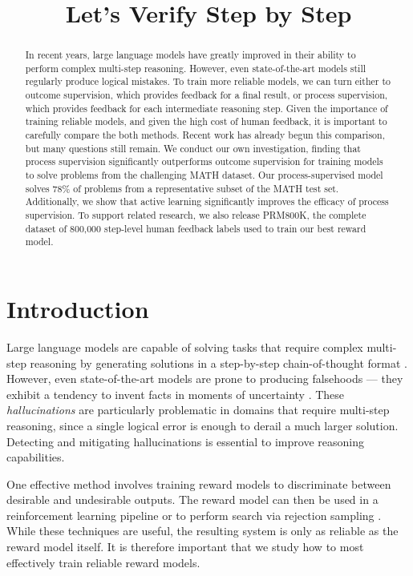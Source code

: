 \title{{ Let's Verify Step by Step}}

\begin{abstract}
In recent years, large language models have greatly improved in their ability to perform complex multi-step reasoning. However, even state-of-the-art models still regularly produce logical mistakes. To train more reliable models, we can turn either to outcome supervision, which provides feedback for a final result, or process supervision, which provides feedback for each intermediate reasoning step. Given the importance of training reliable models, and given the high cost of human feedback, it is important to carefully compare the both methods. Recent work has already begun this comparison, but many questions still remain. We conduct our own investigation, finding that process supervision significantly outperforms outcome supervision for training models to solve problems from the challenging MATH dataset. Our process-supervised model solves 78\% of problems from a representative subset of the MATH test set. Additionally, we show that active learning significantly improves the efficacy of process supervision. To support related research, we also release PRM800K, the complete dataset of 800,000 step-level human feedback labels used to train our best reward model.
\end{abstract}

\section{Introduction}

Large language models are capable of solving tasks that require complex multi-step reasoning by generating solutions in a step-by-step chain-of-thought format \citep{nye2021show, wei2022chain, kojima2022large}. However, even state-of-the-art models are prone to producing falsehoods --- they exhibit a tendency to invent facts in moments of uncertainty \citep{bubeck2023sparks}. These \textit{hallucinations} \citep{maynez2020faithfulness} are particularly problematic in domains that require multi-step reasoning, since a single logical error is enough to derail a much larger solution. Detecting and mitigating hallucinations is essential to improve reasoning capabilities.

One effective method involves training reward models to discriminate between desirable and undesirable outputs. The reward model can then be used in a reinforcement learning pipeline \citep{ziegler2019fine, stiennon2020learning, nakano2021webgpt, ouyang2022training} or to perform search via rejection sampling \citep{nichols2020collaborative, shen2021generate, cobbe2021training}. While these techniques are useful, the resulting system is only as reliable as the reward model itself. It is therefore important that we study how to most effectively train reliable reward models.

